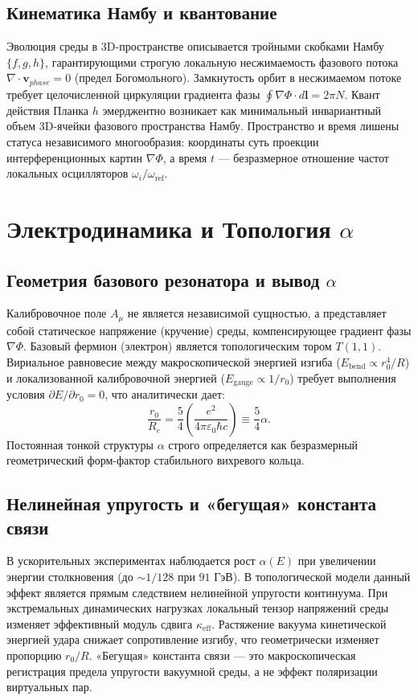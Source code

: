 \documentclass[12pt,a4paper]{article}
\begin{document}
\subsection{Кинематика Намбу и квантование}
Эволюция среды в 3D-пространстве описывается тройными скобками Намбу $\{f, g, h\}$, гарантирующими строгую локальную несжимаемость фазового потока $\nabla \cdot \mathbf{v}_{phase} = 0$ (предел Богомольного). Замкнутость орбит в несжимаемом потоке требует целочисленной циркуляции градиента фазы $\oint \nabla \Phi \cdot d\mathbf{l} = 2\pi N$. Квант действия Планка $h$ эмерджентно возникает как минимальный инвариантный объем 3D-ячейки фазового пространства Намбу. Пространство и время лишены статуса независимого многообразия: координаты суть проекции интерференционных картин $\nabla \Phi$, а время $t$ — безразмерное отношение частот локальных осцилляторов $\omega_i / \omega_{\text{ref}}$.

\section{Электродинамика и Топология $\alpha$}

\subsection{Геометрия базового резонатора и вывод $\alpha$}
Калибровочное поле $A_\mu$ не является независимой сущностью, а представляет собой статическое напряжение (кручение) среды, компенсирующее градиент фазы $\nabla \Phi$. Базовый фермион (электрон) является топологическим тором $T(1,1)$. Вириальное равновесие между макроскопической энергией изгиба ($E_{\text{bend}} \propto r_0^4/R$) и локализованной калибровочной энергией ($E_{\text{gauge}} \propto 1/r_0$) требует выполнения условия $\partial E / \partial r_0 = 0$, что аналитически дает:
\begin{equation}
\frac{r_0}{R_e} = \frac{5}{4} \left( \frac{e^2}{4\pi\varepsilon_0 \hbar c} \right) \equiv \frac{5}{4} \alpha.
\end{equation}
Постоянная тонкой структуры $\alpha$ строго определяется как безразмерный геометрический форм-фактор стабильного вихревого кольца.

\subsection{Нелинейная упругость и «бегущая» константа связи}
В ускорительных экспериментах наблюдается рост $\alpha(E)$ при увеличении энергии столкновения (до $\sim 1/128$ при $91$ ГэВ). В топологической модели данный эффект является прямым следствием нелинейной упругости континуума. При экстремальных динамических нагрузках локальный тензор напряжений среды изменяет эффективный модуль сдвига $\kappa_{\text{eff}}$. Растяжение вакуума кинетической энергией удара снижает сопротивление изгибу, что геометрически изменяет пропорцию $r_0/R$. «Бегущая» константа связи — это макроскопическая регистрация предела упругости вакуумной среды, а не эффект поляризации виртуальных пар.
\end{document}
